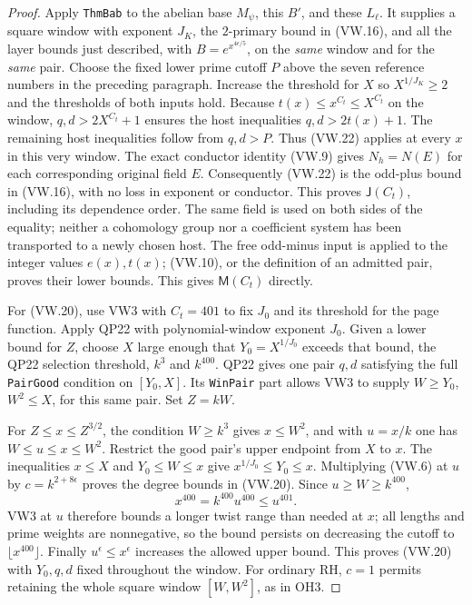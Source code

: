 \begin{proof}
Apply \texttt{ThmBab} to the abelian base $M_\psi$, this $B'$, and these
$L_\ell$.  It supplies a square window with exponent $J_K$, the
$2$-primary bound in (VW.16), and all the layer bounds just described,
with $B=e^{x^{4\epsilon/5}}$, on the \emph{same} window and for the
\emph{same} pair.  Choose the fixed lower prime cutoff $P$ above the
seven reference numbers in the preceding paragraph.  Increase the
threshold for $X$ so $X^{1/J_K}\ge2$ and the thresholds of both
inputs hold.  Because $t(x)\le x^{C_t}\le X^{C_t}$ on the window,
$q,d>2X^{C_t}+1$ ensures the host inequalities $q,d>2t(x)+1$.
The remaining host inequalities follow from $q,d>P$.
Thus (VW.22) applies at every $x$ in this very window.  The exact
conductor identity (VW.9) gives $N_h=N(E)$ for each corresponding
original field $E$.  Consequently (VW.22) is the odd-plus bound in
(VW.16), with no loss in exponent or conductor.  This proves
$\mathsf J(C_t)$, including its dependence order.  The same field is
used on both sides of the equality; neither a cohomology group nor a
coefficient system has been transported to a newly chosen host.
The free odd-minus input is applied to the integer values $e(x),t(x)$;
(VW.10), or the definition of an admitted pair, proves their lower
bounds.  This gives $\mathsf M(C_t)$ directly.

For (VW.20), use VW3 with $C_t=401$ to fix $J_0$ and its threshold
for the page function.  Apply QP22 with polynomial-window exponent
$J_0$.  Given a lower bound for $Z$, choose $X$ large enough that
$Y_0=X^{1/J_0}$ exceeds that bound, the QP22 selection threshold,
$k^3$ and $k^{400}$.  QP22 gives one pair $q,d$ satisfying the full
\texttt{PairGood} condition on $[Y_0,X]$.  Its \texttt{WinPair} part
allows VW3 to supply $W\ge Y_0$, $W^2\le X$, for this same pair.
Set $Z=kW$.

For $Z\le x\le Z^{3/2}$, the condition $W\ge k^3$ gives
$x\le W^2$, and with $u=x/k$ one has $W\le u\le x\le W^2$.
Restrict the good pair's upper endpoint from $X$ to $x$.
The inequalities $x\le X$ and $Y_0\le W\le x$ give
$x^{1/J_0}\le Y_0\le x$.
Multiplying (VW.6) at $u$ by $c=k^{2+8\epsilon}$ proves the degree
bounds in (VW.20).  Since $u\ge W\ge k^{400}$,
\[
                   x^{400}=k^{400}u^{400}\le u^{401}.
\]
VW3 at $u$ therefore bounds a longer twist range than needed at $x$;
all lengths and prime weights are nonnegative, so the bound persists
on decreasing the cutoff to $\lfloor x^{400}\rfloor$.
Finally $u^\epsilon\le x^\epsilon$ increases the allowed upper bound.
This proves (VW.20) with $Y_0,q,d$ fixed throughout the window.
For ordinary RH, $c=1$ permits retaining the whole square window
$[W,W^2]$, as in OH3.
\end{proof}

